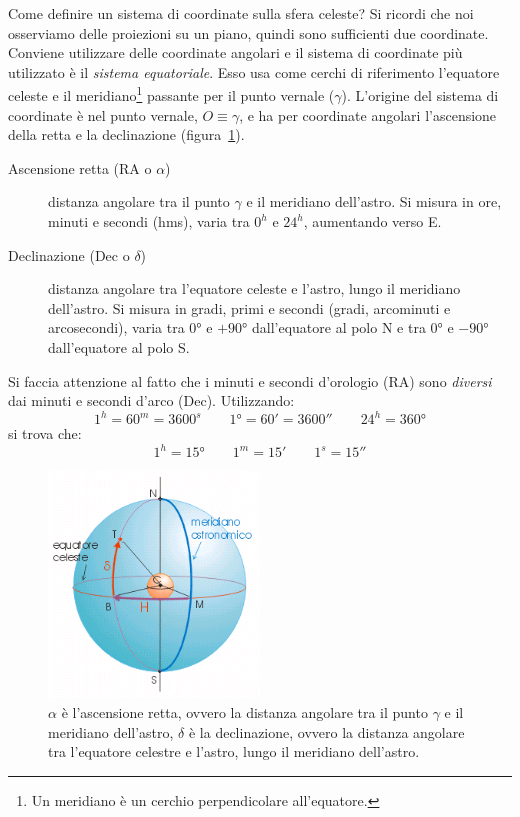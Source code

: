 Come definire un sistema di coordinate sulla sfera celeste? Si ricordi che noi osserviamo delle proiezioni su un piano, quindi sono sufficienti due coordinate. Conviene utilizzare delle coordinate angolari e il sistema di coordinate più utilizzato è il \emph{sistema equatoriale}. Esso usa come cerchi di riferimento l'equatore celeste e il meridiano\footnote{Un meridiano è un cerchio perpendicolare all'equatore.} passante per il punto vernale ($\gamma$). L'origine del sistema di coordinate è nel punto vernale, $O \equiv \gamma$, e ha per coordinate angolari l'ascensione della retta e la declinazione (figura~\ref{fig:sistema-equatoriale}).
\begin{description}
    \item[Ascensione retta (RA o $\alpha$)] distanza angolare tra il punto $\gamma$ e il meridiano dell'astro. Si misura in ore, minuti e secondi (hms), varia tra $0^h$ e $24^h$, aumentando verso E.
    \item[Declinazione (Dec o $\delta$)] distanza angolare tra l'equatore celeste e l'astro, lungo il meridiano dell'astro. Si misura in gradi, primi e secondi (gradi, arcominuti e arcosecondi), varia tra $\ang{0}$ e $+\ang{90}$ dall'equatore al polo N e tra $\ang{0}$ e $-\ang{90}$ dall'equatore al polo S.
\end{description}
Si faccia attenzione al fatto che i minuti e secondi d'orologio (RA) sono \emph{diversi} dai minuti e secondi d'arco (Dec). Utilizzando:
\[
    1^h = 60^m = 3600^s \qquad \ang{1} = \ang{;60} = \ang{;;3600} \qquad 24^h = \ang{360}
\]
si trova che:
\[
    1^h = \ang{15} \qquad 1^m = \ang{;15} \qquad 1^s = \ang{;;15}
\]

\begin{figure}
\centering
\includegraphics[width=0.5\textwidth]{immagini/sistema-equatoriale.png}
\caption{$\alpha$ è l'ascensione retta, ovvero la distanza angolare tra il punto $\gamma$ e il meridiano dell'astro, $\delta$ è la declinazione, ovvero la distanza angolare tra l'equatore celestre e l'astro, lungo il meridiano dell'astro.}
\label{fig:sistema-equatoriale}
\end{figure}

